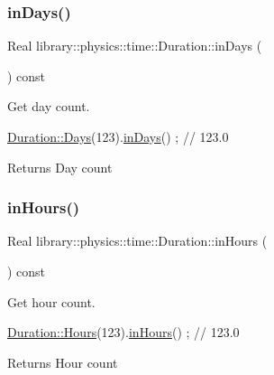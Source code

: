 \subsubsection{\texorpdfstring{in\+Days()}{inDays()}}
{\footnotesize\ttfamily Real library\+::physics\+::time\+::\+Duration\+::in\+Days (\begin{DoxyParamCaption}{ }\end{DoxyParamCaption}) const}



Get day count. 


\begin{DoxyCode}
\hyperlink{classlibrary_1_1physics_1_1time_1_1_duration_abf1323fa113b5203747ce9aec5c969fc}{Duration::Days}(123).\hyperlink{classlibrary_1_1physics_1_1time_1_1_duration_a73ebd929416f360ff5c4c840fbcae67b}{inDays}() ; \textcolor{comment}{// 123.0}
\end{DoxyCode}


\begin{DoxyReturn}{Returns}
Day count 
\end{DoxyReturn}
\mbox{\label{classlibrary_1_1physics_1_1time_1_1_duration_a1f5e207d7c6f7b62d3cfee13e75dfa48}} 
\subsubsection{\texorpdfstring{in\+Hours()}{inHours()}}
{\footnotesize\ttfamily Real library\+::physics\+::time\+::\+Duration\+::in\+Hours (\begin{DoxyParamCaption}{ }\end{DoxyParamCaption}) const}



Get hour count. 


\begin{DoxyCode}
\hyperlink{classlibrary_1_1physics_1_1time_1_1_duration_aadef86b1b803b8764380ef623f99ce95}{Duration::Hours}(123).\hyperlink{classlibrary_1_1physics_1_1time_1_1_duration_a1f5e207d7c6f7b62d3cfee13e75dfa48}{inHours}() ; \textcolor{comment}{// 123.0}
\end{DoxyCode}


\begin{DoxyReturn}{Returns}
Hour count 
\end{DoxyReturn}
\mbox{\label{classlibrary_1_1physics_1_1time_1_1_duration_a69c9501a4432aac49cecd9d47da7c4f6}} 
